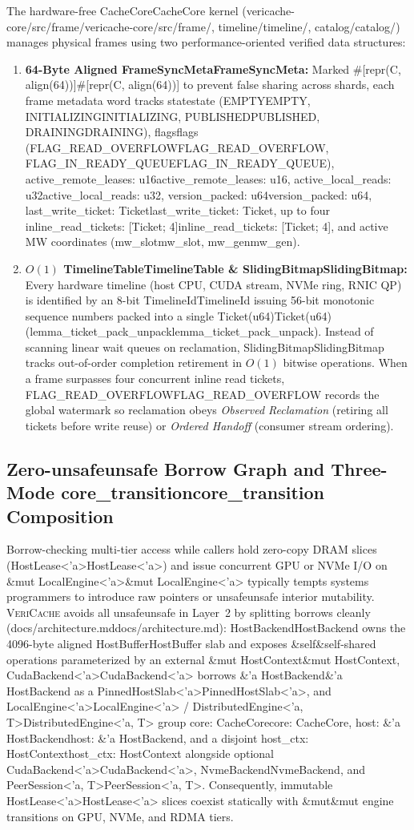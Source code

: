 \documentclass[11pt,a4paper]{article}
\let\origunderscore\_
\DeclareRobustCommand{\code}[1]{{\ttfamily\ifmmode #1\else\def\_{\origunderscore\hspace{0pt}}#1\fi}}
\newcommand{\VC}{\textsc{VeriCache}}
\begin{document}
The hardware-free \code{CacheCore} kernel (\code{vericache-core/src/frame/}, \code{timeline/}, \code{catalog/}) manages physical frames using two performance-oriented verified data structures:
\begin{enumerate}
  \item \textbf{64-Byte Aligned \code{FrameSyncMeta}:} Marked \code{\#[repr(C, align(64))]} to prevent false sharing across shards, each frame metadata word tracks \code{state} (\code{EMPTY}, \code{INITIALIZING}, \code{PUBLISHED}, \code{DRAINING}), \code{flags} (\code{FLAG\_READ\_OVERFLOW}, \code{FLAG\_IN\_READY\_QUEUE}), \code{active\_remote\_leases: u16}, \code{active\_local\_reads: u32}, \code{version\_packed: u64}, \code{last\_write\_ticket: Ticket}, up to four \code{inline\_read\_tickets: [Ticket; 4]}, and active MW coordinates (\code{mw\_slot}, \code{mw\_gen}).
  \item \textbf{$O(1)$ \code{TimelineTable} \& \code{SlidingBitmap}:} Every hardware timeline (host CPU, CUDA stream, NVMe ring, RNIC QP) is identified by an 8-bit \code{TimelineId} issuing 56-bit monotonic sequence numbers packed into a single \code{Ticket(u64)} (\code{lemma\_ticket\_pack\_unpack}). Instead of scanning linear wait queues on reclamation, \code{SlidingBitmap} tracks out-of-order completion retirement in $O(1)$ bitwise operations. When a frame surpasses four concurrent inline read tickets, \code{FLAG\_READ\_OVERFLOW} records the global watermark so reclamation obeys \emph{Observed Reclamation} (retiring all tickets before write reuse) or \emph{Ordered Handoff} (consumer stream ordering).
\end{enumerate}

\subsection{Zero-\code{unsafe} Borrow Graph and Three-Mode \code{core\_transition} Composition}

Borrow-checking multi-tier access while callers hold zero-copy DRAM slices (\code{HostLease<'a>}) and issue concurrent GPU or NVMe I/O on \code{\&mut LocalEngine<'a>} typically tempts systems programmers to introduce raw pointers or \code{unsafe} interior mutability. \VC{} avoids all \code{unsafe} in Layer~2 by splitting borrows cleanly (\code{docs/architecture.md}): \code{HostBackend} owns the 4096-byte aligned \code{HostBuffer} slab and exposes \code{\&self}-shared operations parameterized by an external \code{\&mut HostContext}, \code{CudaBackend<'a>} borrows \code{\&'a HostBackend} as a \code{PinnedHostSlab<'a>}, and \code{LocalEngine<'a>} / \code{DistributedEngine<'a, T>} group \code{core: CacheCore}, \code{host: \&'a HostBackend}, and a disjoint \code{host\_ctx: HostContext} alongside optional \code{CudaBackend<'a>}, \code{NvmeBackend}, and \code{PeerSession<'a, T>}. Consequently, immutable \code{HostLease<'a>} slices coexist statically with \code{\&mut} engine transitions on GPU, NVMe, and RDMA tiers.
\end{document}
